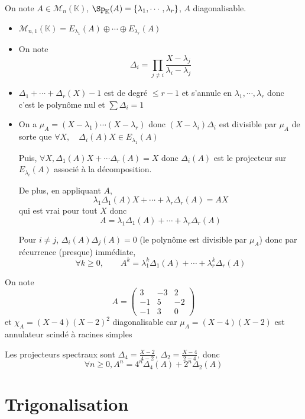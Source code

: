 On note $A\in\mathcal M_n(\mathbb K)$, $\Sp_{\mathbb K}(A)=\{\lambda_1, \cdots, \lambda_r\}$, $A$ diagonalisable. \begin{itemize}
    \item $\mathcal M_{n, 1}(\mathbb K)=E_{\lambda_1}(A)\oplus\cdots \oplus E_{\lambda_r}(A)$
    \item On note \[
            \Delta_i=\prod_{j\neq i}\frac{X-\lambda_j}{\lambda_i-\lambda_j}
        \]
    \item $\Delta_1+\cdots +\Delta_r(X)-1$ est de degré $\leq r-1$ et s'annule en $\lambda_1, \cdots, \lambda_r$ donc c'est le polynôme nul et $\sum \Delta_i=1$
    \item On a $\mu_A=(X-\lambda_1)\cdots (X-\lambda_r)$ donc $(X-\lambda_i)\Delta_i$ est divisible par $\mu_A$ de sorte que $\forall X, \quad \Delta_i(A)X\in E_{\lambda_1}(A)$

        Puis, $\forall X, \Delta_1(A)X+\cdots \Delta_r(A)=X$ donc $\Delta_i(A)$ est le projecteur sur $E_{\lambda_i}(A)$ associé à la décomposition.

        De plus, en appliquant $A$, \[
            \lambda_1\Delta_1(A)X+\cdots + \lambda_r\Delta_r(A)=AX
        \]
        qui est vrai pour tout $X$ donc \[
            A=\lambda_1\Delta_1(A)+\cdots +\lambda_r\Delta_r(A)
        \]

        Pour $i\neq j$, $\Delta_i(A)\Delta_j(A)=0$ (le polynôme est divisible par $\mu_A$) donc par récurrence (presque) immédiate, \[
            \forall k\geq 0, \qquad A^k=\lambda_1^k\Delta_1(A)+\cdots +\lambda_r^k\Delta_r(A)
        \]
\end{itemize}

\begin{ex}
    On note \[
        A= \begin{pmatrix}
            3 & -3 & 2 \\
            -1 & 5 & -2 \\
            -1 & 3 & 0
        \end{pmatrix}
    \]
    et $\chi_A=(X-4)(X-2)^2$ diagonalisable car $\mu_A=(X-4)(X-2)$ est annulateur scindé à racines simples

    Les projecteurs spectraux sont $\Delta_4=\frac{X-2}{4-2}$, $\Delta_2=\frac{X-4}{2-4}$, donc \[
        \forall n\geq 0, A^n=4^n\Delta_4(A)+2^n\Delta_2(A)
    \]
\end{ex}

\section{Trigonalisation}

